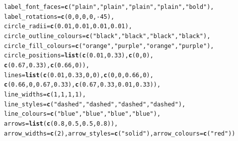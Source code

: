 \documentclass{article}\usepackage[]{graphicx}\usepackage[]{color}
\makeatletter
\newcommand{\hlnum}[1]{\textcolor[rgb]{0.686,0.059,0.569}{#1}}%
\newcommand{\hlstr}[1]{\textcolor[rgb]{0.192,0.494,0.8}{#1}}%
\newcommand{\hlopt}[1]{\textcolor[rgb]{0,0,0}{#1}}%
\newcommand{\hlstd}[1]{\textcolor[rgb]{0.345,0.345,0.345}{#1}}%
\newcommand{\hlkwc}[1]{\textcolor[rgb]{0.333,0.667,0.333}{#1}}%
\newcommand{\hlkwd}[1]{\textcolor[rgb]{0.737,0.353,0.396}{\textbf{#1}}}%
\newenvironment{kframe}{%
 \def\at@end@of@kframe{}%
 \ifinner\ifhmode%
  \def\at@end@of@kframe{\end{minipage}}%
  \begin{minipage}{\columnwidth}%
 \fi\fi%
 \def\FrameCommand##1{\hskip\@totalleftmargin \hskip-\fboxsep
 \colorbox{shadecolor}{##1}\hskip-\fboxsep
     \hskip-\linewidth \hskip-\@totalleftmargin \hskip\columnwidth}%
 \MakeFramed {\advance\hsize-\width
   \@totalleftmargin\z@ \linewidth\hsize
   \@setminipage}}%
 {\par\unskip\endMakeFramed%
 \at@end@of@kframe}
\newenvironment{knitrout}{}{} %
\makeatother
\begin{document}
\begin{knitrout}
\begin{kframe}
\begin{alltt}
        \hlkwc{label_font_faces}\hlstd{=}\hlkwd{c}\hlstd{(}\hlstr{"plain"}\hlstd{,}\hlstr{"plain"}\hlstd{,}\hlstr{"plain"}\hlstd{,}\hlstr{"plain"}\hlstd{,}\hlstr{"bold"}\hlstd{),}
        \hlkwc{label_rotations}\hlstd{=}\hlkwd{c}\hlstd{(}\hlnum{0}\hlstd{,}\hlnum{0}\hlstd{,}\hlnum{0}\hlstd{,}\hlnum{0}\hlstd{,}\hlopt{-}\hlnum{45}\hlstd{),}
        \hlkwc{circle_radii}\hlstd{=}\hlkwd{c}\hlstd{(}\hlnum{0.01}\hlstd{,}\hlnum{0.01}\hlstd{,}\hlnum{0.01}\hlstd{,}\hlnum{0.01}\hlstd{),}
        \hlkwc{circle_outline_colours}\hlstd{=}\hlkwd{c}\hlstd{(}\hlstr{"black"}\hlstd{,}\hlstr{"black"}\hlstd{,}\hlstr{"black"}\hlstd{,}\hlstr{"black"}\hlstd{),}
        \hlkwc{circle_fill_colours}\hlstd{=}\hlkwd{c}\hlstd{(}\hlstr{"orange"}\hlstd{,}\hlstr{"purple"}\hlstd{,}\hlstr{"orange"}\hlstd{,}\hlstr{"purple"}\hlstd{),}
        \hlkwc{circle_positions}\hlstd{=}\hlkwd{list}\hlstd{(}\hlkwd{c}\hlstd{(}\hlnum{0.01}\hlstd{,}\hlnum{0.33}\hlstd{),}\hlkwd{c}\hlstd{(}\hlnum{0}\hlstd{,}\hlnum{0}\hlstd{),}
                \hlkwd{c}\hlstd{(}\hlnum{0.67}\hlstd{,}\hlnum{0.33}\hlstd{),}\hlkwd{c}\hlstd{(}\hlnum{0.66}\hlstd{,}\hlnum{0}\hlstd{)),}
        \hlkwc{lines}\hlstd{=}\hlkwd{list}\hlstd{(}\hlkwd{c}\hlstd{(}\hlnum{0.01}\hlstd{,}\hlnum{0.33}\hlstd{,}\hlnum{0}\hlstd{,}\hlnum{0}\hlstd{),}\hlkwd{c}\hlstd{(}\hlnum{0}\hlstd{,}\hlnum{0}\hlstd{,}\hlnum{0.66}\hlstd{,}\hlnum{0}\hlstd{),}
                \hlkwd{c}\hlstd{(}\hlnum{0.66}\hlstd{,}\hlnum{0}\hlstd{,}\hlnum{0.67}\hlstd{,}\hlnum{0.33}\hlstd{),}\hlkwd{c}\hlstd{(}\hlnum{0.67}\hlstd{,}\hlnum{0.33}\hlstd{,}\hlnum{0.01}\hlstd{,}\hlnum{0.33}\hlstd{)),}
        \hlkwc{line_widths}\hlstd{=}\hlkwd{c}\hlstd{(}\hlnum{1}\hlstd{,} \hlnum{1}\hlstd{,} \hlnum{1}\hlstd{,} \hlnum{1}\hlstd{),}
        \hlkwc{line_styles}\hlstd{=}\hlkwd{c}\hlstd{(}\hlstr{"dashed"}\hlstd{,} \hlstr{"dashed"}\hlstd{,} \hlstr{"dashed"}\hlstd{,} \hlstr{"dashed"}\hlstd{),}
        \hlkwc{line_colours}\hlstd{=}\hlkwd{c}\hlstd{(}\hlstr{"blue"}\hlstd{,}\hlstr{"blue"}\hlstd{,}\hlstr{"blue"}\hlstd{,}\hlstr{"blue"}\hlstd{),}
        \hlkwc{arrows}\hlstd{=}\hlkwd{list}\hlstd{(}\hlkwd{c}\hlstd{(}\hlnum{0.8}\hlstd{,}\hlnum{0.5}\hlstd{,}\hlnum{0.5}\hlstd{,}\hlnum{0.8}\hlstd{)),}
        \hlkwc{arrow_widths}\hlstd{=}\hlkwd{c}\hlstd{(}\hlnum{2}\hlstd{),} \hlkwc{arrow_styles}\hlstd{=}\hlkwd{c}\hlstd{(}\hlstr{"solid"}\hlstd{),} \hlkwc{arrow_colours}\hlstd{=}\hlkwd{c}\hlstd{(}\hlstr{"red"}\hlstd{))}
\end{alltt}
\end{kframe}


\end{knitrout}
\end{document}
